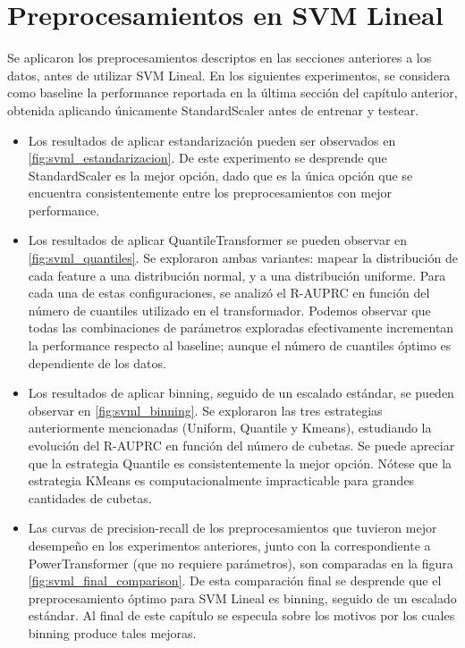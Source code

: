\section { Preprocesamientos en SVM Lineal }

Se aplicaron los preprocesamientos descriptos en las secciones anteriores a los datos, antes de utilizar SVM Lineal. En los siguientes experimentos, se considera como baseline la performance reportada en la última sección del capítulo anterior, obtenida aplicando únicamente StandardScaler antes de entrenar y testear. 

\begin{itemize}

\item Los resultados de aplicar estandarización pueden ser observados en \ref{fig:svml_estandarizacion}. De este experimento se desprende que StandardScaler es la mejor opción, dado que es la única opción que se encuentra consistentemente entre los preprocesamientos con mejor performance.

\item Los resultados de aplicar QuantileTransformer se pueden observar en \ref{fig:svml_quantiles}. Se exploraron ambas variantes: mapear la distribución de cada feature a una distribución normal, y a una distribución uniforme. Para cada una de estas configuraciones, se analizó el R-AUPRC en función del número de cuantiles utilizado en el transformador. Podemos observar que todas las combinaciones de parámetros exploradas efectivamente incrementan la performance respecto al baseline; aunque el número de cuantiles óptimo es dependiente de los datos.

\item Los resultados de aplicar binning, seguido de un escalado estándar, se pueden observar en \ref{fig:svml_binning}. Se exploraron las tres estrategias anteriormente mencionadas (Uniform, Quantile y Kmeans), estudiando la evolución del R-AUPRC en función del número de cubetas. Se puede apreciar que la estrategia Quantile es consistentemente la mejor opción. Nótese que la estrategia KMeans es computacionalmente impracticable para grandes cantidades de cubetas.

\item Las curvas de precision-recall de los preprocesamientos que tuvieron mejor desempeño en los experimentos anteriores, junto con la correspondiente a PowerTransformer (que no requiere parámetros), son comparadas en la figura \ref{fig:svml_final_comparison}. De esta comparación final se desprende que el preprocesamiento óptimo para SVM Lineal es binning, seguido de un escalado estándar. Al final de este capítulo se especula sobre los motivos por los cuales binning produce tales mejoras.
\end{itemize}


